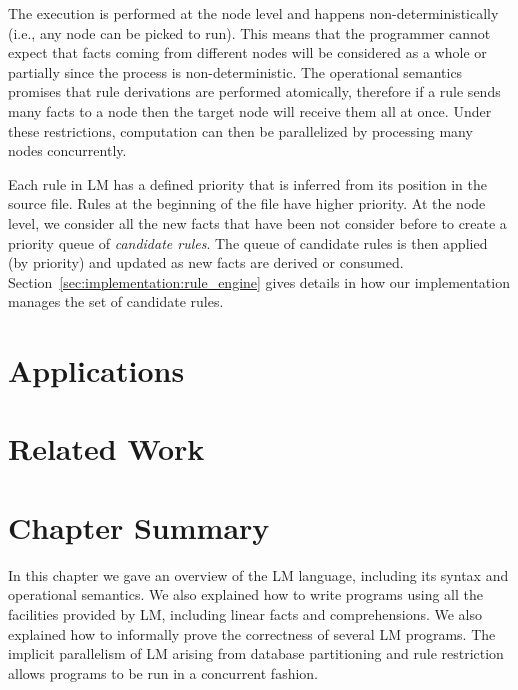 The execution is performed at the node level and happens non-deterministically
(i.e., any node can be picked to run). This means that the programmer cannot
expect that facts coming from different nodes will be considered as a whole or
partially since the process is non-deterministic. The operational semantics
promises that rule derivations are performed atomically, therefore if a rule
sends many facts to a node then the target node will receive them all at once.
Under these restrictions, computation can then be parallelized by processing
many nodes concurrently.

Each rule in LM has a defined priority that is inferred from its position in the
source file.  Rules at the beginning of the file have higher priority. At the
node level, we consider all the new facts that have been not consider before to
create a priority queue of \emph{candidate rules}.  The queue of candidate rules
is then applied (by priority) and updated as new facts are derived or consumed.
Section~\ref{sec:implementation:rule_engine} gives details in how our
implementation manages the set of candidate rules.

\section{Applications}


\section{Related Work}\label{section:language:related}

\section{Chapter Summary}

In this chapter we gave an overview of the LM language, including its syntax and
operational semantics.  We also explained how to write programs using all the
facilities provided by LM, including linear facts and comprehensions. We also
explained how to informally prove the correctness of several LM programs.  The implicit
parallelism of LM arising from database partitioning and rule restriction allows
programs to be run in a concurrent fashion.
